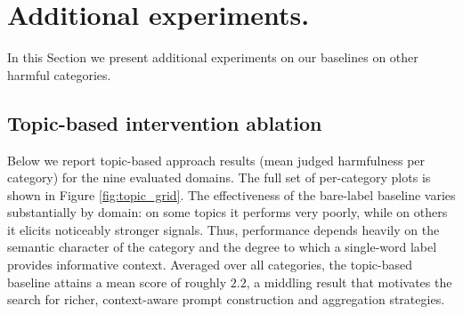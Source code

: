 \documentclass{article}
\theoremstyle{plain}
\theoremstyle{definition}
\theoremstyle{remark}
\begin{document}
\section{Additional experiments.}
In this Section we present additional experiments on our baselines on other harmful categories. 

\subsection{Topic-based intervention ablation} \label{subsec:topic_ablation}

Below we report topic-based approach results (mean judged harmfulness per category) for the nine evaluated domains. The full set of per-category plots is shown in Figure \ref{fig:topic_grid}. The effectiveness of the bare-label baseline varies substantially by domain: on some topics it performs very poorly, while on others it elicits noticeably stronger signals. Thus, performance depends heavily on the semantic character of the category and the degree to which a single-word label provides informative context. Averaged over all categories, the topic-based baseline attains a mean score of roughly $2.2$, a middling result that motivates the search for richer, context-aware prompt construction and aggregation strategies.
\end{document}
